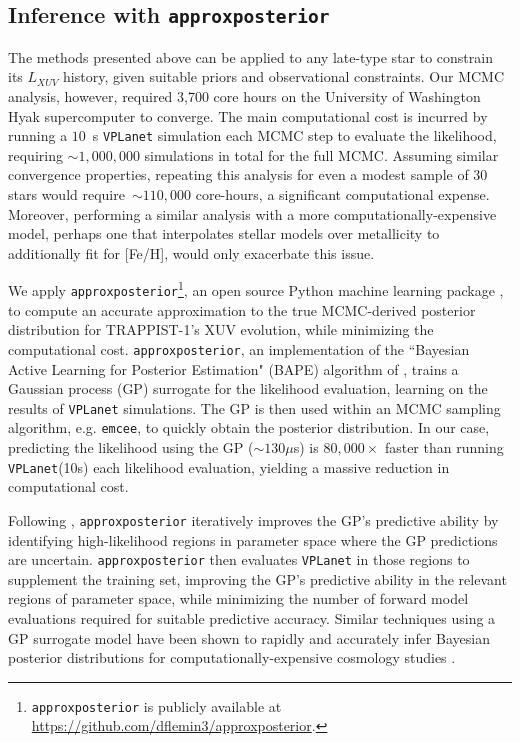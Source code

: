 \documentclass[twocolumn]{aastex62}
\newcommand{\vplanet}[0]{\texttt{VPLanet}\xspace}
\newcommand{\emcee}[0]{\texttt{emcee}\xspace}
\newcommand{\approxposterior}[0]{\texttt{approxposterior}\xspace}
\begin{document}
\subsection{Inference with \approxposterior} \label{sec:methods:approx}

The methods presented above can be applied to any late-type star to constrain its $L_{XUV}$ history, given suitable priors and observational constraints. Our MCMC analysis, however, required 3,700 core hours on the University of Washington Hyak supercomputer to converge. The main computational cost is incurred by running a $10$~s \vplanet simulation each MCMC step to evaluate the likelihood, requiring ${\sim}1,000,000$ simulations in total for the full MCMC. Assuming similar convergence properties, repeating this analysis for even a modest sample of 30 stars would require~${\sim} 110,000$ core-hours, a significant computational expense. Moreover, performing a similar analysis with a more computationally-expensive model, perhaps one that interpolates stellar models over metallicity to additionally fit for [Fe/H], would only exacerbate this issue.

We apply \approxposterior\footnote{\approxposterior is publicly available at \href{https://github.com/dflemin3/approxposterior}{https://github.com/dflemin3/approxposterior}.}, an open source Python machine learning package \citep{FlemingVanderPlas2018}, to compute an accurate approximation to the true MCMC-derived posterior distribution for TRAPPIST-1's XUV evolution, while minimizing the computational cost. \approxposterior, an implementation of the ``Bayesian Active Learning for Posterior Estimation" (BAPE) algorithm of \citet{Kandasamy2015}, trains a Gaussian process (GP) surrogate for the likelihood evaluation, learning on the results of \vplanet simulations. The GP is then used within an MCMC sampling algorithm, e.g. \emcee, to quickly obtain the posterior distribution. In our case, predicting the likelihood using the GP (${\sim} 130 \mu$s) is $80,000 \times$ faster than running \vplanet (10s) each likelihood evaluation, yielding a massive reduction in computational cost.

Following \citet{Kandasamy2015}, \approxposterior iteratively improves the GP's predictive ability by identifying high-likelihood regions in parameter space where the GP predictions are uncertain. \approxposterior then evaluates \vplanet in those regions to supplement the training set, improving the GP's predictive ability in the relevant regions of parameter space, while minimizing the number of forward model evaluations required for suitable predictive accuracy. Similar techniques using a GP surrogate model have been shown to rapidly and accurately infer Bayesian posterior distributions for computationally-expensive cosmology studies \citep[e.g.][]{Bird2019}.
\end{document}
